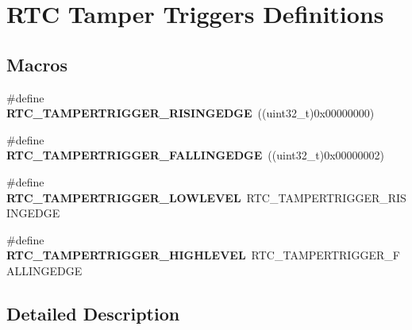 \hypertarget{group___r_t_c_ex___tamper___trigger___definitions}{}\section{R\+TC Tamper Triggers Definitions}
\label{group___r_t_c_ex___tamper___trigger___definitions}
\subsection*{Macros}
\begin{DoxyCompactItemize}
\item 
\#define {\bfseries R\+T\+C\+\_\+\+T\+A\+M\+P\+E\+R\+T\+R\+I\+G\+G\+E\+R\+\_\+\+R\+I\+S\+I\+N\+G\+E\+D\+GE}~((uint32\+\_\+t)0x00000000)\hypertarget{group___r_t_c_ex___tamper___trigger___definitions_ga7956947a7b9350248051fc077a525474}{}\label{group___r_t_c_ex___tamper___trigger___definitions_ga7956947a7b9350248051fc077a525474}

\item 
\#define {\bfseries R\+T\+C\+\_\+\+T\+A\+M\+P\+E\+R\+T\+R\+I\+G\+G\+E\+R\+\_\+\+F\+A\+L\+L\+I\+N\+G\+E\+D\+GE}~((uint32\+\_\+t)0x00000002)\hypertarget{group___r_t_c_ex___tamper___trigger___definitions_gafdc500829e8f36346f1cbca1a52eb083}{}\label{group___r_t_c_ex___tamper___trigger___definitions_gafdc500829e8f36346f1cbca1a52eb083}

\item 
\#define {\bfseries R\+T\+C\+\_\+\+T\+A\+M\+P\+E\+R\+T\+R\+I\+G\+G\+E\+R\+\_\+\+L\+O\+W\+L\+E\+V\+EL}~R\+T\+C\+\_\+\+T\+A\+M\+P\+E\+R\+T\+R\+I\+G\+G\+E\+R\+\_\+\+R\+I\+S\+I\+N\+G\+E\+D\+GE\hypertarget{group___r_t_c_ex___tamper___trigger___definitions_ga20c580db49e266f2295aeed5a6915b4e}{}\label{group___r_t_c_ex___tamper___trigger___definitions_ga20c580db49e266f2295aeed5a6915b4e}

\item 
\#define {\bfseries R\+T\+C\+\_\+\+T\+A\+M\+P\+E\+R\+T\+R\+I\+G\+G\+E\+R\+\_\+\+H\+I\+G\+H\+L\+E\+V\+EL}~R\+T\+C\+\_\+\+T\+A\+M\+P\+E\+R\+T\+R\+I\+G\+G\+E\+R\+\_\+\+F\+A\+L\+L\+I\+N\+G\+E\+D\+GE\hypertarget{group___r_t_c_ex___tamper___trigger___definitions_gae3a6644686f404fa94d23ccab6f5165b}{}\label{group___r_t_c_ex___tamper___trigger___definitions_gae3a6644686f404fa94d23ccab6f5165b}

\end{DoxyCompactItemize}


\subsection{Detailed Description}

